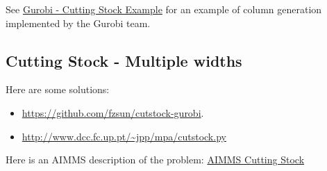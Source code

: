 See \href{https://github.com/Gurobi/modeling-examples/blob/master/colgen-cutting_stock/colgen-cutting_stock.ipynb}{Gurobi - Cutting Stock Example} for an example of column generation implemented by the Gurobi team.

\subsection{Cutting Stock - Multiple widths}



Here are some solutions:
\begin{itemize}
\item  \url{https://github.com/fzsun/cutstock-gurobi}.
\item \url{http://www.dcc.fc.up.pt/~jpp/mpa/cutstock.py}
\end{itemize}


Here is an AIMMS description of the problem: 
\href{https://download.aimms.com/aimms/download/manuals/AIMMS3OM_CuttingStock.pdf}{AIMMS Cutting Stock}




